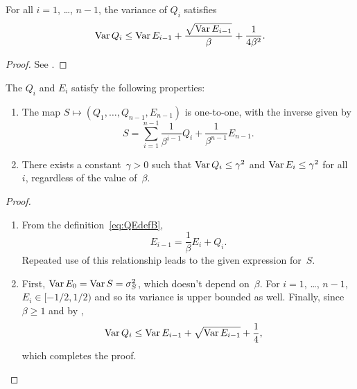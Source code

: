 \begin{lemma}
  \label{lem:Qvarbound}
  For all $i = 1$, \dots, $n-1$, the variance of $Q_i$ satisfies
  \begin{equation*}
    \operatorname{Var} Q_i \le \operatorname{Var} E_{i-1} + \frac{\sqrt{\operatorname{Var} E_{i-1}}}{\beta} +
    \frac{1}{4\beta^2}.
  \end{equation*}
\end{lemma}

\begin{proof}
  See .
\end{proof}

\begin{proposition}
  \label{prop:qeproperties}
  The $Q_i$ and $E_i$ satisfy the following properties:
\begin{enumerate}
  \item The map $S \mapsto (Q_1, \dots, Q_{n-1}, E_{n-1})$ is one-to-one, with
    the inverse given by
    \begin{equation}
      \label{eq:unwraprec}
      S = \sum_{i=1}^{n-1} \frac{1}{\beta^{i-1}} Q_i + \frac{1}{\beta^{n-1}}
      E_{n-1}.
    \end{equation}

  \item There exists a constant~$\gamma > 0$ such that $\operatorname{Var} Q_i \le \gamma^2$
    and $\operatorname{Var} E_i \le \gamma^2$ for all~$i$, regardless of the value of~$\beta$.
\end{enumerate}
\end{proposition}

\begin{proof}
  \begin{enumerate}
    \item From the definition~\eqref{eq:QEdefB}, 
    \begin{equation}
      \label{eq:reverserec}
      E_{i-1} = \frac{1}{\beta} E_i + Q_i.
    \end{equation}
    Repeated use of this relationship leads to the given expression for~$S$. 

  \item First, $\operatorname{Var} E_0 = \operatorname{Var} S = {\sigma_S^2}$, which doesn't depend
    on~$\beta$. For $i = 1$, \ldots, $n-1$, $E_i \in [-1/2, 1/2)$ and so its
    variance is upper bounded as well. Finally, since $\beta \ge 1$ and by
    , 
    \begin{align*}
      \operatorname{Var} Q_i &\le \operatorname{Var} E_{i-1} + \sqrt{\operatorname{Var} E_{i-1}} + \frac14,
    \end{align*}
    which completes the proof.
  \end{enumerate}
\end{proof}

